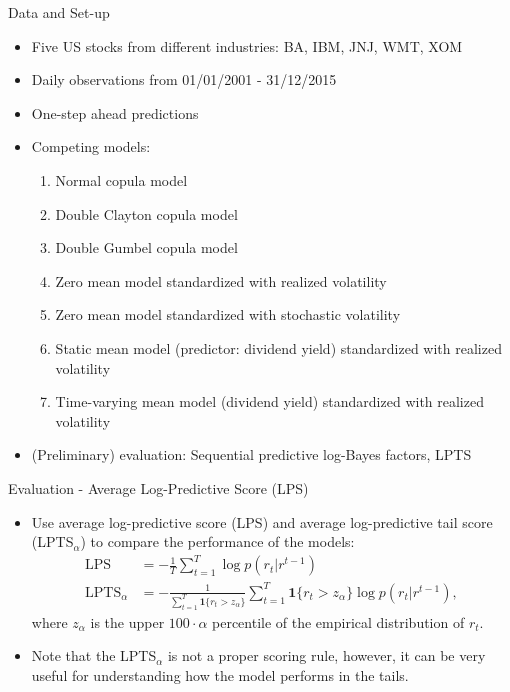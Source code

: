 \documentclass[9pt,xcolor=x11names,compress]{beamer}
\begin{document}
\begin{frame}{Data and Set-up}
	\begin{itemize}
		\item Five US stocks from different industries: BA, IBM, JNJ, WMT, XOM 
		\item Daily observations from 01/01/2001 - 31/12/2015
		\item One-step ahead predictions
		\item Competing models:
		\begin{enumerate}
			\item Normal copula model
			\item Double Clayton copula model
			\item Double Gumbel copula model
			\item Zero mean model standardized with realized volatility
			\item Zero mean model standardized with stochastic volatility
			\item Static mean model (predictor: dividend yield) standardized with realized volatility
			\item Time-varying mean model (dividend yield) standardized with realized volatility
		\end{enumerate}
		\item (Preliminary) evaluation: Sequential predictive log-Bayes factors, LPTS
		
	\end{itemize}
\end{frame}

\begin{frame}{Evaluation - Average Log-Predictive Score (LPS)}
	\begin{itemize}
		\item Use average log-predictive score (LPS) and average log-predictive tail score (LPTS$_{\alpha}$) to compare the performance of the models:
		\begin{align*}
		\text{LPS}&=-\frac{1}{T} \sum\limits_{t=1}^T \log p(r_t|r^{t-1})\\
		\text{LPTS}_{\alpha}&=-\frac{1}{\sum\limits_{t=1}^T \mathbf{1}\{r_t>z_{\alpha}\}}\sum\limits_{t=1}^T\mathbf{1}\{r_t>z_{\alpha}\}\log p(r_t|r^{t-1}),
		\end{align*} 
		where $z_{\alpha}$ is the upper $100\cdot\alpha$ percentile of the empirical distribution of $r_t$. 
		
		\item Note that the LPTS$_{\alpha}$ is not a proper scoring rule, however, it can be very useful for understanding how the model performs in the tails.
	\end{itemize}
\end{frame}
\end{document}
